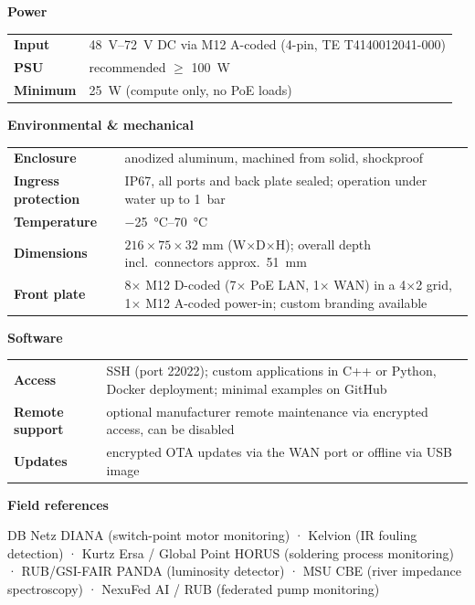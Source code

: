 \documentclass[10pt,a4paper]{article}
\begin{document}
\begin{minipage}[t]{0.48\textwidth}
\textbf{Power}\par\vspace{1mm}
\begin{tabularx}{\textwidth}{@{}>{\bfseries}p{2.9cm}X@{}}
\toprule
Input & \SIrange{48}{72}{V} DC via M12 A-coded (4-pin, TE T4140012041-000) \\
PSU & recommended $\geq$ \SI{100}{W} \\
Minimum & \SI{25}{W} (compute only, no PoE loads) \\
\bottomrule
\end{tabularx}

\vspace{2mm}
\textbf{Environmental \& mechanical}\par\vspace{1mm}
\begin{tabularx}{\textwidth}{@{}>{\bfseries}p{2.9cm}X@{}}
\toprule
Enclosure & anodized aluminum, machined from solid, shockproof \\
Ingress protection & IP67, all ports and back plate sealed; operation under water up to \SI{1}{bar} \\
Temperature & \SIrange{-25}{70}{\celsius} \\
Dimensions & $216 \times 75 \times 32$ \si{mm} (W$\times$D$\times$H); overall depth incl.\ connectors approx.\ \SI{51}{mm} \\
Front plate & 8$\times$ M12 D-coded (7$\times$ PoE LAN, 1$\times$ WAN) in a 4$\times$2 grid, 1$\times$ M12 A-coded power-in; custom branding available \\
\bottomrule
\end{tabularx}

\vspace{2mm}
\textbf{Software}\par\vspace{1mm}
\begin{tabularx}{\textwidth}{@{}>{\bfseries}p{2.9cm}X@{}}
\toprule
Access & SSH (port 22022); custom applications in C++ or Python, Docker deployment; minimal examples on GitHub \\
Remote support & optional manufacturer remote maintenance via encrypted access, can be disabled \\
Updates & encrypted OTA updates via the WAN port or offline via USB image \\
\bottomrule
\end{tabularx}

\vspace{2mm}
\textbf{Field references}\par\vspace{1mm}
{\small DB Netz DIANA (switch-point motor monitoring) · Kelvion (IR fouling detection) · Kurtz Ersa / Global Point HORUS (soldering process monitoring) · RUB/GSI-FAIR PANDA (luminosity detector) · MSU CBE (river impedance spectroscopy) · NexuFed AI / RUB (federated pump monitoring)}
\end{minipage}
\end{document}
